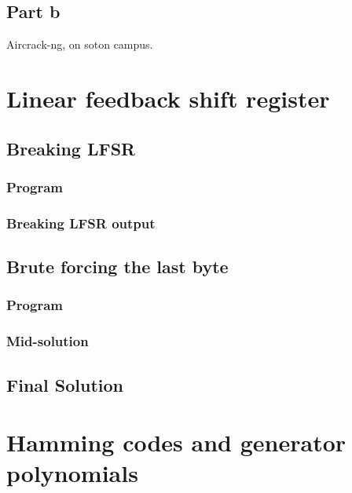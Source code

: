 \documentclass[pdftex, 11pt, a4paper]{article}
\begin{document}
\subsection{Part b}
Aircrack-ng, on soton campus.

\pagebreak
\printbibliography

\pagebreak
\appendices
\section{Linear feedback shift register}
\subsection{Breaking LFSR}
\subsubsection{Program}\label{break-lfsr}

\pagebreak

\subsubsection{Breaking LFSR output}\label{break-lfsr-out}
\pagebreak

\subsection{Brute forcing the last byte}
\subsubsection{Program}\label{last-byte}

\pagebreak

\subsubsection{Mid-solution}\label{last-byte-out}

\subsection{Final Solution}\label{q1-solution}
\pagebreak

\section{Hamming codes and generator polynomials}
\end{document}
